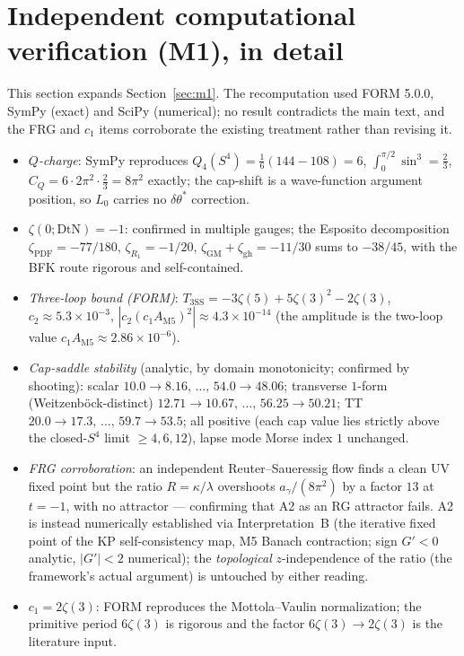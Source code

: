 \documentclass[11pt,a4paper]{article}
\theoremstyle{plain}
\theoremstyle{definition}
\theoremstyle{remark}
\newcommand{\ag}{a_\gamma}
\newcommand{\CQ}{C_Q}
\newcommand{\dtheta}{\delta\theta}
\begin{document}
\section{Independent computational verification (M1), in detail}
\label{sec:m1detail}
This section expands Section~\ref{sec:m1}. The recomputation used FORM 5.0.0, SymPy (exact) and
SciPy (numerical); no result contradicts the main text, and the FRG and $c_1$ items corroborate
the existing treatment rather than revising it.
\begin{itemize}[leftmargin=*,nosep]
\item \emph{$Q$-charge}: SymPy reproduces $Q_4(S^4) = \tfrac16(144-108) = 6$,
$\int_0^{\pi/2}\sin^3 = \tfrac23$, $\CQ = 6\cdot2\pi^2\cdot\tfrac23 = 8\pi^2$ exactly; the
cap-shift is a wave-function argument position, so $L_0$ carries no $\dtheta^*$ correction.
\item \emph{$\zeta(0;\mathrm{DtN}) = -1$}: confirmed in multiple gauges; the Esposito
decomposition $\zeta_{\mathrm{PDF}} = -77/180$, $\zeta_{R_1} = -1/20$,
$\zeta_{\mathrm{GM}}+\zeta_{\mathrm{gh}} = -11/30$ sums to $-38/45$, with the BFK route rigorous
and self-contained.
\item \emph{Three-loop bound (FORM)}: $T_{3\mathrm{SS}} = -3\zeta(5) + 5\zeta(3)^2 - 2\zeta(3)$,
$c_2 \approx 5.3\times10^{-3}$, $|c_2 (c_1 A_{\mathrm{M5}})^2| \approx 4.3\times10^{-14}$ (the amplitude is the two-loop value $c_1 A_{\mathrm{M5}}\approx2.86\times10^{-6}$).
\item \emph{Cap-saddle stability} (analytic, by domain monotonicity; confirmed by shooting):
scalar $10.0\to8.16,\,\dots,\,54.0\to48.06$; transverse $1$-form (Weitzenb\"ock-distinct)
$12.71\to10.67,\,\dots,\,56.25\to50.21$; TT $20.0\to17.3,\,\dots,\,59.7\to53.5$; all positive
(each cap value lies strictly above the closed-$S^4$ limit $\ge4,6,12$),
lapse mode Morse index $1$ unchanged.
\item \emph{FRG corroboration}: an independent Reuter--Saueressig flow finds a clean UV fixed
point but the ratio $R = \kappa/\lambda$ overshoots $\ag/(8\pi^2)$ by a factor $13$ at $t=-1$,
with no attractor --- confirming that A2 as an RG attractor fails. A2 is instead numerically established via
Interpretation~B (the iterative fixed point of the KP self-consistency map, M5 Banach
contraction; sign $G'<0$ analytic, $|G'|<2$ numerical); the \emph{topological} $z$-independence of the ratio (the framework's actual
argument) is untouched by either reading.
\item \emph{$c_1 = 2\zeta(3)$}: FORM reproduces the Mottola--Vaulin normalization; the primitive
period $6\zeta(3)$ is rigorous and the factor $6\zeta(3)\to2\zeta(3)$ is the literature input.
\end{itemize}
\end{document}
